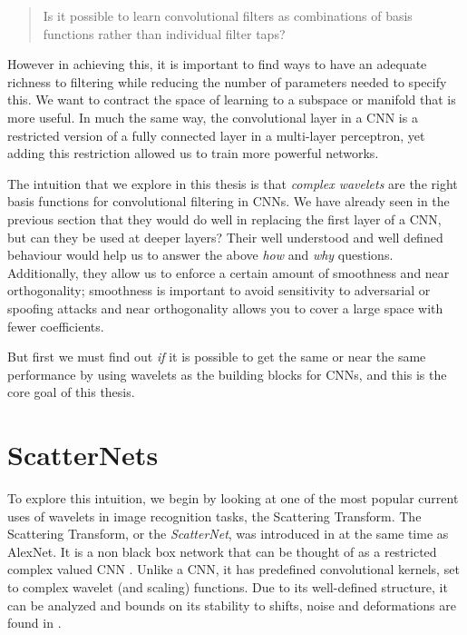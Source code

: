 \begin{quote}
  Is it possible to learn convolutional filters as 
  combinations of basis functions rather than individual filter taps?
\end{quote}

However in achieving this, it is important to find ways to have an adequate
richness to filtering while reducing the number of parameters needed to specify
this. We want to contract the space of learning to a subspace or manifold that 
is more useful. In much the same way, the convolutional layer in a CNN is a restricted
version of a fully connected layer in a multi-layer perceptron, yet adding this
restriction allowed us to train more powerful networks. 

The intuition that we explore in this thesis is that \emph{complex wavelets} are the
right basis functions for convolutional filtering in CNNs. We have already seen in the
previous section that they would do well in replacing the first layer of a CNN,
but can they be used at deeper layers? Their well understood and
well defined behaviour would help us to answer the above \emph{how} and \emph{why}
questions. Additionally, they allow us to enforce a certain amount of smoothness and near
orthogonality; smoothness is important to avoid sensitivity to adversarial or
spoofing attacks \cite{szegedy_intriguing_2013} and near orthogonality
allows you to cover a large space with fewer coefficients.

But first we must find out \emph{if} it is possible to get the same or near the same
performance by using wavelets as the building blocks for CNNs, and this is the
core goal of this thesis. 

\section{ScatterNets}
To explore this intuition, we begin by looking at one of the most
popular current uses of wavelets in image recognition tasks, the
Scattering Transform. 
The Scattering Transform, or the \emph{ScatterNet}, was introduced in \cite{mallat_group_2012,
bruna_invariant_2013} at the same time as AlexNet. It is a non black box
network that can be thought of as a restricted complex valued CNN
\cite{bruna_mathematical_2015}. Unlike a CNN, it has predefined
convolutional kernels, set to complex wavelet (and scaling) functions. Due to
its well-defined structure, it can be analyzed and bounds on its stability to 
shifts, noise and deformations are found in \cite{mallat_group_2012}.
%

